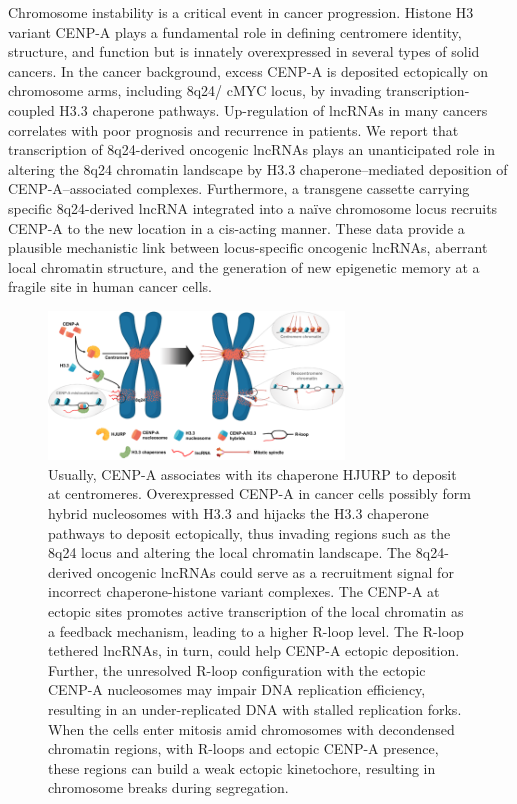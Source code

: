 Chromosome instability is a critical event in cancer progression. Histone H3 variant CENP-A plays a fundamental role in defining centromere identity, structure, and function but is innately overexpressed in several types of solid cancers. In the cancer background, excess CENP-A is deposited ectopically on chromosome arms, including 8q24/ cMYC locus, by invading transcription-coupled H3.3 chaperone pathways. Up-regulation of lncRNAs in many cancers correlates with poor prognosis and recurrence in patients. We report that transcription of 8q24-derived oncogenic lncRNAs plays an unanticipated role in altering the 8q24 chromatin landscape by H3.3 chaperone–mediated deposition of CENP-A–associated complexes. Furthermore, a transgene cassette carrying specific 8q24-derived lncRNA integrated into a naïve chromosome locus recruits CENP-A to the new location in a cis-acting manner. These data provide a plausible mechanistic link between locus-specific oncogenic lncRNAs, aberrant local chromatin structure, and the generation of new epigenetic memory at a fragile site in human cancer cells.

\begin{figure}
\centering
\includegraphics[width=0.7\textwidth]{../_resources/cenp.png}
\caption{Usually, CENP-A associates with its chaperone HJURP to deposit at centromeres. Overexpressed CENP-A in cancer cells possibly form hybrid nucleosomes with H3.3 and hijacks the H3.3 chaperone pathways to deposit ectopically, thus invading regions such as the 8q24 locus and altering the local chromatin landscape. The 8q24-derived oncogenic lncRNAs could serve as a recruitment signal for incorrect chaperone-histone variant complexes. The CENP-A at ectopic sites promotes active transcription of the local chromatin as a feedback mechanism, leading to a higher R-loop level. The R-loop tethered lncRNAs, in turn, could help CENP-A ectopic deposition. Further, the unresolved R-loop configuration with the ectopic CENP-A nucleosomes may impair DNA replication efficiency, resulting in an under-replicated DNA with stalled replication forks. When the cells enter mitosis amid chromosomes with decondensed chromatin regions, with R-loops and ectopic CENP-A presence, these regions can build a weak ectopic kinetochore, resulting in chromosome breaks during segregation.}
\end{figure}

